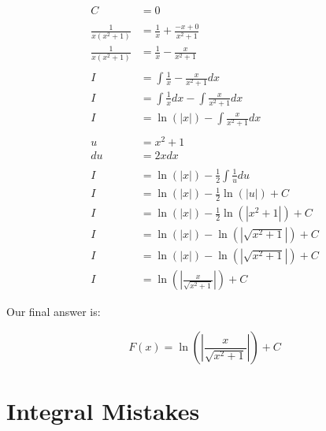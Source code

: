 \documentclass[12pt]{article}
\begin{document}
\begin{align}
    C                  & = 0                                                       \\
    \nonumber                                                                      \\
    \frac{1}{x(x^2+1)} & = \frac{1}{x} + \frac{-x+0}{x^2+1}                        \\
    \frac{1}{x(x^2+1)} & = \frac{1}{x} - \frac{x}{x^2+1}                           \\
    \nonumber                                                                      \\
    I                  & = \int \frac{1}{x} - \frac{x}{x^2+1} dx                   \\
    I                  & = \int \frac{1}{x} dx - \int \frac{x}{x^2+1} dx           \\
    I                  & = \ln(|x|) - \int \frac{x}{x^2+1} dx                      \\
    \nonumber                                                                      \\
    u                  & = x^2+1                                                   \\
    du                 & = 2x dx                                                   \\
    \nonumber                                                                      \\
    I                  & = \ln(|x|) - \frac{1}{2} \int \frac{1}{u} du              \\
    I                  & = \ln(|x|) - \frac{1}{2} \ln(|u|) + C                     \\
    I                  & = \ln(|x|) - \frac{1}{2} \ln(|x^2+1|) + C                 \\
    I                  & = \ln(|x|) - \ln(|\sqrt{x^2+1}|) + C                      \\
    I                  & = \ln(|x|) - \ln(|\sqrt{x^2+1}|) + C                      \\
    I                  & = \ln\left(\left|\frac{x}{\sqrt{x^2+1}}\right|\right) + C
\end{align}


Our final answer is:

$$
    F(x) = \ln\left(\left|\frac{x}{\sqrt{x^2+1}}\right|\right) + C
$$

\section{Integral Mistakes}
\end{document}
